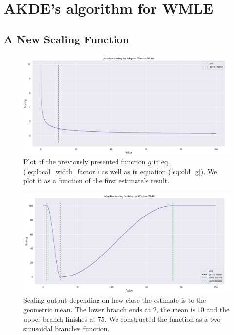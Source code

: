 \section{AKDE's algorithm for WMLE}
\subsection{A New Scaling Function}



\begin{figure}
\centering
\includegraphics[width = 0.95 \textwidth]{../imag/chap3/old_funct.png}
\caption{Plot of the previously presented function $g$ in eq. (\ref{eq:local_width_factor}) as well as in equation (\ref{eq:old_g}). We plot it as a function of the first estimate's result.}
\label{fig:old_scaling}
\end{figure}


\begin{figure}
\centering
\includegraphics[width = 0.95 \textwidth]{../imag/chap3/my_new_funct.png}
\caption{Scaling output depending on how close the estimate is to the geometric mean. The lower branch ends at $2$, the mean is $10$ and the upper branch finishes at $75$. We constructed the function as a two sinusoidal branches function.}
\label{fig:new_scaling}
\end{figure}

